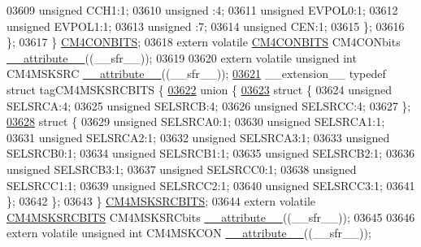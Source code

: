 \begin{DoxyCode}
03609       \textcolor{keywordtype}{unsigned} CCH1:1;
03610       \textcolor{keywordtype}{unsigned} :4;
03611       \textcolor{keywordtype}{unsigned} EVPOL0:1;
03612       \textcolor{keywordtype}{unsigned} EVPOL1:1;
03613       \textcolor{keywordtype}{unsigned} :7;
03614       \textcolor{keywordtype}{unsigned} CEN:1;
03615     \};
03616   \};
03617 \} \hyperlink{a00008_dd/d4e/a00329}{CM4CONBITS};
03618 \textcolor{keyword}{extern} \textcolor{keyword}{volatile} \hyperlink{a00008_dd/d4e/a00329}{CM4CONBITS} CM4CONbits \hyperlink{a00009_a493c46f03454991ccc5aa7a6e1dfb2a7}{\_\_attribute\_\_}((\_\_sfr\_\_));
03619 
03620 \textcolor{keyword}{extern} \textcolor{keyword}{volatile} \textcolor{keywordtype}{unsigned} \textcolor{keywordtype}{int}  CM4MSKSRC \hyperlink{a00009_a493c46f03454991ccc5aa7a6e1dfb2a7}{\_\_attribute\_\_}((\_\_sfr\_\_));
\hypertarget{a00009_source_l03621}{}\hyperlink{a00008}{03621} \_\_extension\_\_ \textcolor{keyword}{typedef} \textcolor{keyword}{struct }tagCM4MSKSRCBITS \{
\hypertarget{a00009_source_l03622}{}\hyperlink{a00009}{03622}   \textcolor{keyword}{union }\{
\hypertarget{a00009_source_l03623}{}\hyperlink{a00009}{03623}     \textcolor{keyword}{struct }\{
03624       \textcolor{keywordtype}{unsigned} SELSRCA:4;
03625       \textcolor{keywordtype}{unsigned} SELSRCB:4;
03626       \textcolor{keywordtype}{unsigned} SELSRCC:4;
03627     \};
\hypertarget{a00009_source_l03628}{}\hyperlink{a00009}{03628}     \textcolor{keyword}{struct }\{
03629       \textcolor{keywordtype}{unsigned} SELSRCA0:1;
03630       \textcolor{keywordtype}{unsigned} SELSRCA1:1;
03631       \textcolor{keywordtype}{unsigned} SELSRCA2:1;
03632       \textcolor{keywordtype}{unsigned} SELSRCA3:1;
03633       \textcolor{keywordtype}{unsigned} SELSRCB0:1;
03634       \textcolor{keywordtype}{unsigned} SELSRCB1:1;
03635       \textcolor{keywordtype}{unsigned} SELSRCB2:1;
03636       \textcolor{keywordtype}{unsigned} SELSRCB3:1;
03637       \textcolor{keywordtype}{unsigned} SELSRCC0:1;
03638       \textcolor{keywordtype}{unsigned} SELSRCC1:1;
03639       \textcolor{keywordtype}{unsigned} SELSRCC2:1;
03640       \textcolor{keywordtype}{unsigned} SELSRCC3:1;
03641     \};
03642   \};
03643 \} \hyperlink{a00008_dd/d1d/a00336}{CM4MSKSRCBITS};
03644 \textcolor{keyword}{extern} \textcolor{keyword}{volatile} \hyperlink{a00008_dd/d1d/a00336}{CM4MSKSRCBITS} CM4MSKSRCbits \hyperlink{a00009_a493c46f03454991ccc5aa7a6e1dfb2a7}{\_\_attribute\_\_}((\_\_sfr\_\_));
03645 
03646 \textcolor{keyword}{extern} \textcolor{keyword}{volatile} \textcolor{keywordtype}{unsigned} \textcolor{keywordtype}{int}  CM4MSKCON \hyperlink{a00009_a493c46f03454991ccc5aa7a6e1dfb2a7}{\_\_attribute\_\_}((\_\_sfr\_\_));

\end{DoxyCode}
